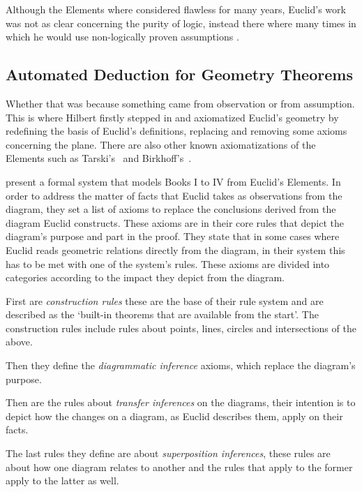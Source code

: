 \documentclass[]{interact}
\theoremstyle{plain}
\theoremstyle{definition}
\theoremstyle{remark}
\newcommand{\term}[1]{\emph{#1\/}}
\newcommand{\quotes}[1]{`#1'}
\begin{document}
Although the Elements where considered flawless for many years,
Euclid's work was not as clear concerning the purity of logic, instead
there where many times in which he would use non-logically proven
assumptions \citep[Sections~1.1 and~2]{harrison:2009}.


\subsection{Automated Deduction for Geometry Theorems}
\label{sec:atp-geometry}

Whether that was because
something came from observation or from assumption. This is where
Hilbert\cite{hilbert1899geometrie} firstly stepped in and axiomatized
Euclid's geometry by redefining the basis of Euclid's definitions,
replacing and removing some axioms concerning the plane. There are
also other known axiomatizations of the Elements such as
Tarski's~\cite{tarski1959elementary} and
Birkhoff's~\cite{birkhoff1932set}.

\citet{avigad-etal:2009} present a formal system that models
Books I to IV from Euclid's Elements. In order to address the matter
of facts that Euclid takes as observations from the diagram, they set
a list of axioms to replace the conclusions derived from the diagram
Euclid constructs. These axioms are in their core rules that depict
the diagram's purpose and part in the proof. They state that in some
cases where Euclid reads geometric relations directly from the
diagram, in their system this has to be met with one of the system's
rules. These axioms are divided into categories according to the
impact they depict from the diagram.

First are \term{construction rules} these are the base of their rule
system and are described as the
\quotes{built-in theorems that are available from the start}.
The construction rules include rules about points, lines, circles and
intersections of the above.

Then they define the \term{diagrammatic inference} axioms, which
replace the diagram's purpose.

Then are the rules about \term{transfer inferences} on the diagrams,
their intention is to depict how the changes on a diagram, as Euclid
describes them, apply on their facts.

The last rules they define are about \term{superposition inferences},
these rules are about how one diagram relates to another and the rules
that apply to the former apply to the latter as well.
\end{document}
